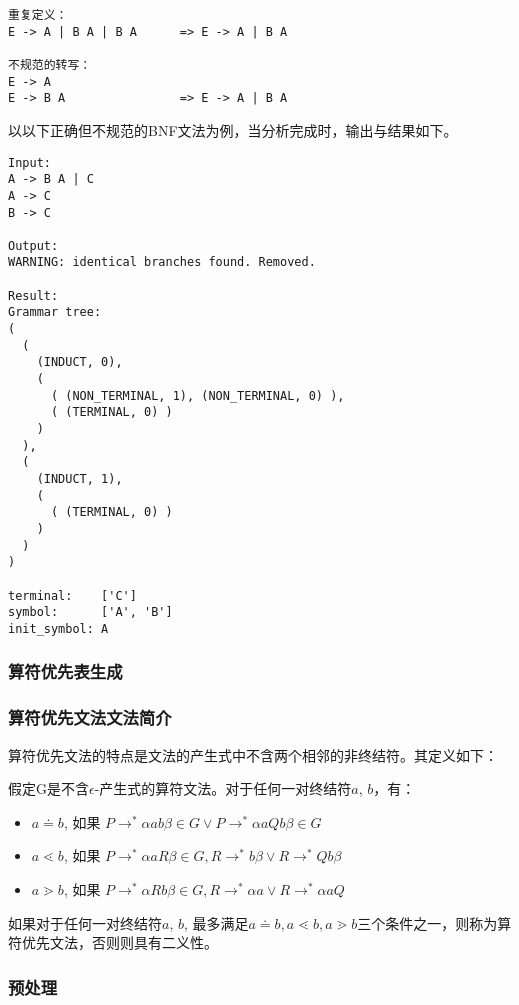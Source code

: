 \begin{lstlisting}[caption=不规范的语句示例]
重复定义：
E -> A | B A | B A      => E -> A | B A

不规范的转写：
E -> A
E -> B A                => E -> A | B A
\end{lstlisting}

以以下正确但不规范的BNF文法为例，当分析完成时，输出与结果如下。

\begin{lstlisting}[caption=BNF分析结果]
Input:
A -> B A | C
A -> C
B -> C

Output:
WARNING: identical branches found. Removed.

Result:
Grammar tree:
(
  (
    (INDUCT, 0),
    (
      ( (NON_TERMINAL, 1), (NON_TERMINAL, 0) ),
      ( (TERMINAL, 0) )
    )
  ),
  (
    (INDUCT, 1),
    (
      ( (TERMINAL, 0) )
    )
  )
)

terminal:    ['C']
symbol:      ['A', 'B']
init_symbol: A
\end{lstlisting}

\subsubsection{算符优先表生成}

\subsubsection*{算符优先文法文法简介}

算符优先文法的特点是文法的产生式中不含两个相邻的非终结符。其定义如下：

假定G是不含$\epsilon$-产生式的算符文法。对于任何一对终结符$a$, $b$，有：

\begin{itemize}
  \item $a \doteq b$, 如果 $ P \rightarrow^* \alpha a b \beta \in G \lor P \rightarrow^* \alpha a Q b \beta \in G $
  \item $a \lessdot b$, 如果 $ P \rightarrow^* \alpha a R \beta \in G, R  \rightarrow^* b\beta \lor R \rightarrow^* Qb\beta $
  \item $a \gtrdot b$, 如果 $ P \rightarrow^* \alpha R b \beta \in G, R  \rightarrow^* \alpha a \lor R \rightarrow^* \alpha aQ $
\end{itemize}

如果对于任何一对终结符$a$, $b$, 最多满足$a \doteq b, a \lessdot b, a \gtrdot b$三个条件之一，则称为算符优先文法，否则则具有二义性。

\subsubsection*{预处理}

